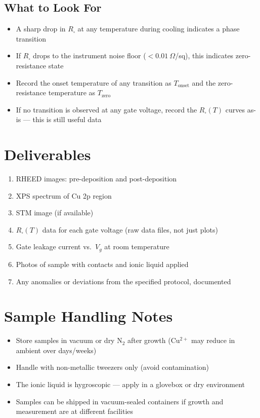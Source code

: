 \documentclass[11pt, a4paper]{article}
\begin{document}
\subsection{What to Look For}

\begin{itemize}[nosep]
  \item A sharp drop in $R_\square$ at any temperature during
        cooling indicates a phase transition
  \item If $R_\square$ drops to the instrument noise floor
        ($< 0.01~\Omega$/sq), this indicates zero-resistance
        state
  \item Record the onset temperature of any transition as
        $T_{\text{onset}}$ and the zero-resistance temperature
        as $T_{\text{zero}}$
  \item If no transition is observed at any gate voltage,
        record the $R_\square(T)$ curves as-is --- this is
        still useful data
\end{itemize}

\section{Deliverables}

\begin{enumerate}[nosep]
  \item RHEED images: pre-deposition and post-deposition
  \item XPS spectrum of Cu 2p region
  \item STM image (if available)
  \item $R_\square(T)$ data for each gate voltage (raw data
        files, not just plots)
  \item Gate leakage current vs.\ $V_g$ at room temperature
  \item Photos of sample with contacts and ionic liquid
        applied
  \item Any anomalies or deviations from the specified
        protocol, documented
\end{enumerate}

\section{Sample Handling Notes}

\begin{itemize}[nosep]
  \item Store samples in vacuum or dry N$_2$ after growth
        (Cu$^{2+}$ may reduce in ambient over days/weeks)
  \item Handle with non-metallic tweezers only (avoid
        contamination)
  \item The ionic liquid is hygroscopic --- apply in a
        glovebox or dry environment
  \item Samples can be shipped in vacuum-sealed containers
        if growth and measurement are at different facilities
\end{itemize}
\end{document}
